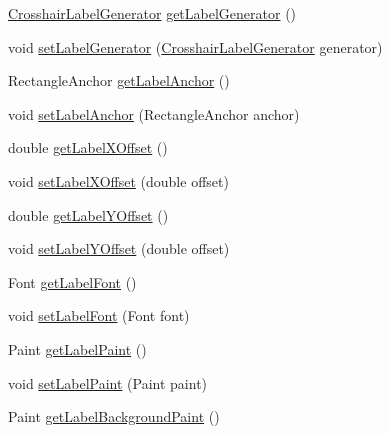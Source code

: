 \begin{DoxyCompactItemize}
\mbox{\hyperlink{interfaceorg_1_1jfree_1_1chart_1_1labels_1_1_crosshair_label_generator}{Crosshair\+Label\+Generator}} \mbox{\hyperlink{classorg_1_1jfree_1_1chart_1_1plot_1_1_crosshair_ad20e769eeae9e0ba7f04c152b080a04f}{get\+Label\+Generator}} ()
\item 
void \mbox{\hyperlink{classorg_1_1jfree_1_1chart_1_1plot_1_1_crosshair_ac07a28b245af96a81878bb4ad015490c}{set\+Label\+Generator}} (\mbox{\hyperlink{interfaceorg_1_1jfree_1_1chart_1_1labels_1_1_crosshair_label_generator}{Crosshair\+Label\+Generator}} generator)
\item 
Rectangle\+Anchor \mbox{\hyperlink{classorg_1_1jfree_1_1chart_1_1plot_1_1_crosshair_a4615a9fac60f3e5cf4b3de47e0cff882}{get\+Label\+Anchor}} ()
\item 
void \mbox{\hyperlink{classorg_1_1jfree_1_1chart_1_1plot_1_1_crosshair_aeed2589fd0bc2003dca5fada8aa2f7f3}{set\+Label\+Anchor}} (Rectangle\+Anchor anchor)
\item 
double \mbox{\hyperlink{classorg_1_1jfree_1_1chart_1_1plot_1_1_crosshair_a3702761bf1f6394f61e44f3763d3e63a}{get\+Label\+X\+Offset}} ()
\item 
void \mbox{\hyperlink{classorg_1_1jfree_1_1chart_1_1plot_1_1_crosshair_a75ba4d6a36718d4c71a71fd65f2896f9}{set\+Label\+X\+Offset}} (double offset)
\item 
double \mbox{\hyperlink{classorg_1_1jfree_1_1chart_1_1plot_1_1_crosshair_a83c5071b95c67fc816c44dff9749d636}{get\+Label\+Y\+Offset}} ()
\item 
void \mbox{\hyperlink{classorg_1_1jfree_1_1chart_1_1plot_1_1_crosshair_a0eeeea778eddf6aca775cb191555f67b}{set\+Label\+Y\+Offset}} (double offset)
\item 
Font \mbox{\hyperlink{classorg_1_1jfree_1_1chart_1_1plot_1_1_crosshair_afb84271c0859b4aed129081296f9ea32}{get\+Label\+Font}} ()
\item 
void \mbox{\hyperlink{classorg_1_1jfree_1_1chart_1_1plot_1_1_crosshair_af031c43475ea37a6083b21c732ab90f7}{set\+Label\+Font}} (Font font)
\item 
Paint \mbox{\hyperlink{classorg_1_1jfree_1_1chart_1_1plot_1_1_crosshair_a45139a89c17fbaf039ed7df2d5441f17}{get\+Label\+Paint}} ()
\item 
void \mbox{\hyperlink{classorg_1_1jfree_1_1chart_1_1plot_1_1_crosshair_ac77cfc040e23230a364d863fa3512ef1}{set\+Label\+Paint}} (Paint paint)
\item 
Paint \mbox{\hyperlink{classorg_1_1jfree_1_1chart_1_1plot_1_1_crosshair_a26faed5cbc5180e8843d2e9daf7108f0}{get\+Label\+Background\+Paint}} ()

\end{DoxyCompactItemize}
